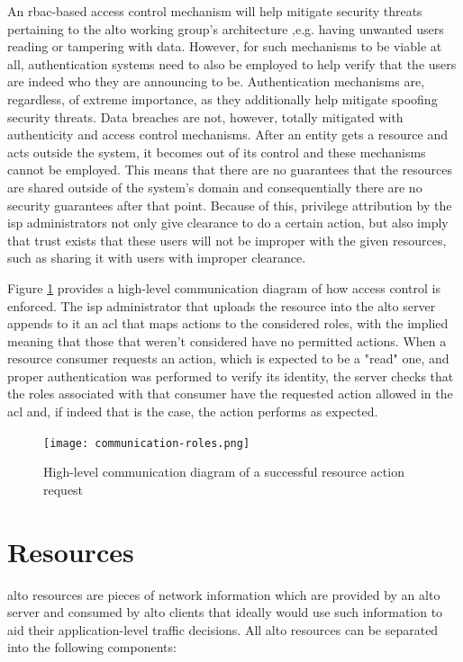     An \gls{rbac}-based access control mechanism will help mitigate security threats pertaining to the \gls{alto} working group's architecture ,e.g. having unwanted users reading or tampering with data.
    However, for such mechanisms to be viable at all, authentication systems need to also be employed to help verify that the users are indeed who they are announcing to be.
    Authentication mechanisms are, regardless, of extreme importance, as they additionally help mitigate spoofing security threats.
    Data breaches are not, however, totally mitigated with authenticity and access control mechanisms.
    After an entity gets a resource and acts outside the system, it becomes out of its control and these mechanisms cannot be employed.
    This means that there are no guarantees that the resources are shared outside of the system's domain and consequentially there are no security guarantees after that point.
    Because of this, privilege attribution by the \gls{isp} administrators not only give clearance to do a certain action, but also imply that trust exists that these users will not be improper with the given resources, such as sharing it with users with improper clearance.

    Figure \ref{fig:communication-roles} provides a high-level communication diagram of how access control is enforced.
    The \gls{isp} administrator that uploads the resource into the \gls{alto} server appends to it an \gls{acl} that maps actions to the considered roles, with the implied meaning that those that weren't considered have no permitted actions.
    When a resource consumer requests an action, which is expected to be a "read" one, and proper authentication was performed to verify its identity, the server checks that the roles associated with that consumer have the requested action allowed in the \gls{acl} and, if indeed that is the case, the action performs as expected.

\begin{figure}[H]
        \centering
        \texttt{[image: communication-roles.png]}
        \caption{High-level communication diagram of a successful resource action request}
        \label{fig:communication-roles}
\end{figure}

\section{Resources}
\label{sec:alto-resources}

    \gls{alto} resources are pieces of network information which are provided by an \gls{alto} server and consumed by \gls{alto} clients that ideally would use such information to aid their application-level traffic decisions.
    All \gls{alto} resources can be separated into the following components:

